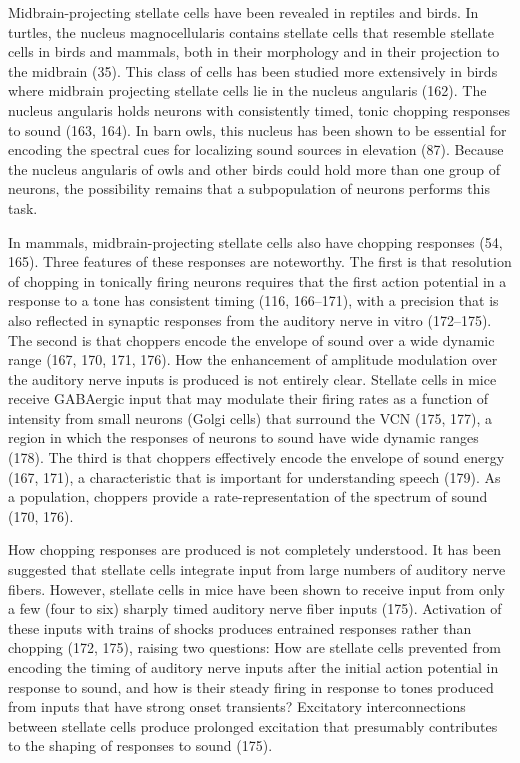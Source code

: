 \documentclass[10pt,a4paper]{article}
\begin{document}
Midbrain-projecting stellate cells have been revealed in reptiles and birds. In
turtles, the nucleus magnocellularis contains stellate cells that resemble
stellate
cells in birds and mammals, both in their morphology and in their projection
to the midbrain (35). This class of cells has been studied more extensively in
birds where midbrain projecting stellate cells lie in the nucleus angularis
(162).
The nucleus angularis holds neurons with consistently timed, tonic chopping
responses to sound (163, 164). In barn owls, this nucleus has been shown to be
essential for encoding the spectral cues for localizing sound sources in
elevation
(87). Because the nucleus angularis of owls and other birds could hold more than
one group of neurons, the possibility remains that a subpopulation of neurons
performs this task.

In mammals, midbrain-projecting stellate cells also have chopping responses
(54, 165). Three features of these responses are noteworthy. The first is that
resolution of chopping in tonically firing neurons requires that the first
action
potential in a response to a tone has consistent timing (116, 166--171), with a
precision that is also reflected in synaptic responses from the auditory nerve
in
vitro (172--175). The second is that choppers encode the envelope of sound over
a wide dynamic range (167, 170, 171, 176). How the enhancement of amplitude
modulation over the auditory nerve inputs is produced is not entirely clear.
Stellate cells in mice receive GABAergic input that may modulate their firing
rates as a function of intensity from small neurons (Golgi cells) that surround
the VCN (175, 177), a region in which the responses of neurons to sound have
wide dynamic ranges (178). The third is that choppers effectively encode the
envelope of sound energy (167, 171), a characteristic that is important for
understanding
speech (179). As a population, choppers provide a rate-representation
of the spectrum of sound (170, 176).

How chopping responses are produced is not completely understood. It has
been suggested that stellate cells integrate input from large numbers of
auditory
nerve fibers. However, stellate cells in mice have been shown to receive input
from only a few (four to six) sharply timed auditory nerve fiber inputs (175).
Activation of these inputs with trains of shocks produces entrained responses
rather than chopping (172, 175), raising two questions: How are stellate cells
prevented from encoding the timing of auditory nerve inputs after the initial
action potential in response to sound, and how is their steady firing in
response
to tones produced from inputs that have strong onset transients?  Excitatory
interconnections between stellate cells produce prolonged excitation that
presumably
contributes to the shaping of responses to sound (175).
\end{document}

